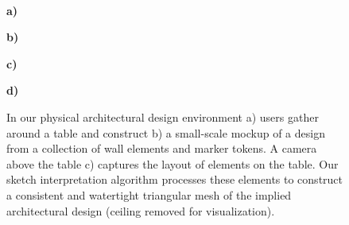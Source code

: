 \begin{figure}[t]
\vspace{-0.2in}
\\
\begin{minipage}{0.98in}\textcolor[rgb]{1,1,1}{\hspace{-0.01in} {\bf a)}} \end{minipage}
\begin{minipage}{1.30in}\textcolor[rgb]{0,0,0}{\hspace{-0.01in} {\bf b)}} \end{minipage}
\begin{minipage}{0.98in}\textcolor[rgb]{1,1,1}{\hspace{-0.01in} {\bf c)}} \end{minipage}
\begin{minipage}{1.20in}\textcolor[rgb]{0,0,0}{\hspace{-0.01in} {\bf d)}} \end{minipage}
\caption{In our physical architectural design environment a) users
  gather around a table and construct b) a small-scale mockup of a
  design from a collection of wall elements and marker tokens.  A
  camera above the table c) captures the layout of elements on the
  table.  Our sketch interpretation algorithm processes these elements
  to construct a consistent and watertight triangular mesh of the
  implied architectural design (ceiling removed for visualization). }
\label{figure:virtual_heliodon}
\end{figure}

